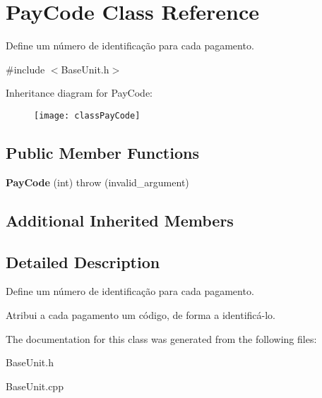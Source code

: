\hypertarget{classPayCode}{\section{Pay\-Code Class Reference}
\label{classPayCode}
}


Define um número de identificação para cada pagamento.  




{\ttfamily \#include $<$Base\-Unit.\-h$>$}

Inheritance diagram for Pay\-Code\-:\begin{figure}[H]
\begin{center}
\leavevmode
\texttt{[image: classPayCode]}
\end{center}
\end{figure}
\subsection*{Public Member Functions}
\begin{DoxyCompactItemize}
\item 
\hypertarget{classPayCode_aa867c5138d3d6858cfc7d87d08ef9599}{{\bfseries Pay\-Code} (int)  throw (invalid\-\_\-argument)}\label{classPayCode_aa867c5138d3d6858cfc7d87d08ef9599}

\end{DoxyCompactItemize}
\subsection*{Additional Inherited Members}


\subsection{Detailed Description}
Define um número de identificação para cada pagamento. 

Atribui a cada pagamento um código, de forma a identificá-\/lo. 

The documentation for this class was generated from the following files\-:\begin{DoxyCompactItemize}
\item 
Base\-Unit.\-h\item 
Base\-Unit.\-cpp\end{DoxyCompactItemize}
